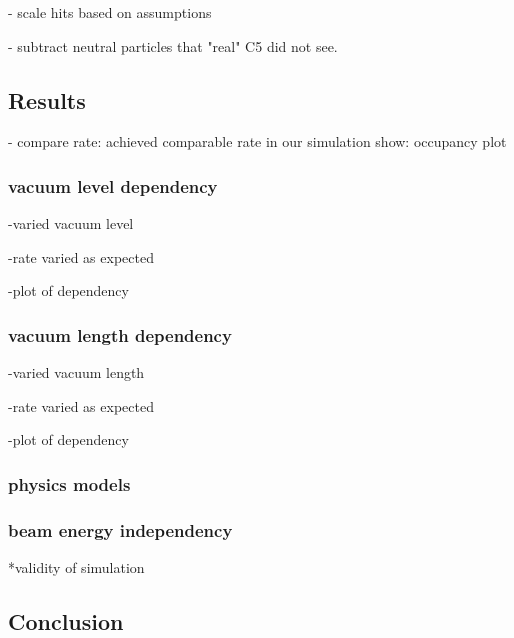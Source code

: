 - scale hits based on assumptions

- subtract neutral particles that "real" C5 did not see.



\subsection{Results}
- compare rate: achieved comparable rate in our simulation
show: occupancy plot

\subsubsection{vacuum level dependency}
-varied vacuum level

-rate varied as expected

-plot of dependency

\subsubsection{vacuum length dependency}
-varied vacuum length

-rate varied as expected

-plot of dependency

\subsubsection{physics models}

\subsubsection{beam energy independency}


*validity of simulation
\subsection{Conclusion}








